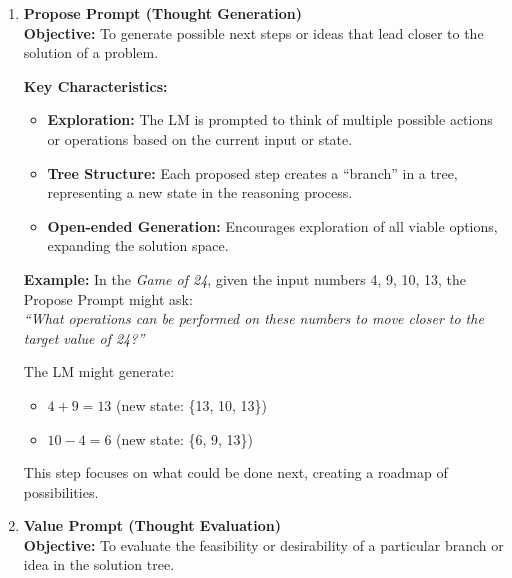\documentclass[12pt, a4paper]{article}
\begin{document}
\begin{enumerate}

    \item \textbf{Propose Prompt (Thought Generation)} \\
    \textbf{Objective:} To generate possible next steps or ideas that lead closer to the solution of a problem.
    
    \textbf{Key Characteristics:}
    \begin{itemize}
        \item \textbf{Exploration:} The LM is prompted to think of multiple possible actions or operations based on the current input or state.
        \item \textbf{Tree Structure:} Each proposed step creates a ``branch'' in a tree, representing a new state in the reasoning process.
        \item \textbf{Open-ended Generation:} Encourages exploration of all viable options, expanding the solution space.
    \end{itemize}
    
    \textbf{Example:}
    In the \textit{Game of 24}, given the input numbers 4, 9, 10, 13, the Propose Prompt might ask: \\
    \textit{``What operations can be performed on these numbers to move closer to the target value of 24?''}
    
    The LM might generate:
    \begin{itemize}
        \item $4 + 9 = 13$ (new state: \{13, 10, 13\})
        \item $10 - 4 = 6$ (new state: \{6, 9, 13\})
    \end{itemize}
    
    This step focuses on what could be done next, creating a roadmap of possibilities.

    \item \textbf{Value Prompt (Thought Evaluation)} \\
    \textbf{Objective:} To evaluate the feasibility or desirability of a particular branch or idea in the solution tree.
    

\end{enumerate}
\end{document}
